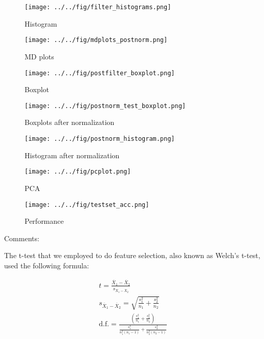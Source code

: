 \begin{figure}[H]
  \centering
    \texttt{[image: ../../fig/filter\_histograms.png]}
\caption{Histogram }
   \label{fig:histogram}
\end{figure}

\begin{figure}[H]
  \centering
    \texttt{[image: ../../fig/mdplots\_postnorm.png]}
\caption{MD plots }
   \label{fig:mdplot}
\end{figure}

\begin{figure}[H]
  \centering
    \texttt{[image: ../../fig/postfilter\_boxplot.png]}
\caption{Boxplot }
   \label{fig:boxplot}
\end{figure}

\begin{figure}[H]
  \centering
    \texttt{[image: ../../fig/postnorm\_test\_boxplot.png]}
\caption{Boxplots after normalization }
   \label{fig:boxplotpost}
\end{figure}

\begin{figure}[H]
  \centering
    \texttt{[image: ../../fig/postnorm\_histogram.png]}
\caption{Histogram after normalization  }
   \label{fig:histogram}
\end{figure}

\begin{figure}[H]
  \centering
    \texttt{[image: ../../fig/pcplot.png]}
\caption{PCA }
   \label{fig:pca}
\end{figure}

\begin{figure}[H]
  \centering
    \texttt{[image: ../../fig/testset\_acc.png]}
\caption{Performance }
   \label{fig:performance}
\end{figure}



Comments:

The t-test that we employed to do feature selection, also known as Welch's
t-test, used the following formula:

\begin{gather}
t = \frac{\overline{X}_1-\overline{X}_2}{s_{\overline{X}_1-\overline{X}_2}} \\
s_{\overline{X}_1-\overline{X}_2} = \sqrt{\frac{s_1^2}{n_1}+\frac{s_2^2}{n_2}} \\
\text{d.f.} = \frac{\left(\frac{s_1^2}{n_1}+\frac{s_2^2}{n_2} \right)}{\frac{s_1^4}{n_1^2(n_1-1)} + \frac{s_2^4}{n_2^2(n_2-1)}}
\end{gather}

